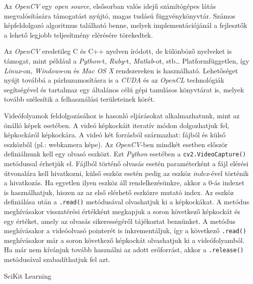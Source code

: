 






Az \textit{OpenCV} egy \textit{open source}, elsősorban valós idejű számítógépes látás megvalósítására támogatást nyújtó, magas tudású függvénykönyvtár. Számos képfeldolgozó algoritmus található benne, melyek implementációjánál a fejlesztők a lehető legjobb teljesítmény elérésére törekedtek.

Az \textit{OpenCV} eredetileg C és C++ nyelven íródott, de különböző nyelveket is támogat, mint például a \textit{Python}-t, \textit{Ruby}-t, \textit{Matlab}-ot, stb\ldots
Platformfüggetlen, így \textit{Linux}-on, \textit{Windows}-on és \textit{Mac OS X} rendszereken is használható. Lehetőséget nyújt továbbá a párhuzamosításra is a \textit{CUDA} és az \textit{OpenCL} technológiák segítségével és tartalmaz egy általános célú gépi tanulásos könyvtárat is, melyek tovább szélesítik a felhasználási területeinek körét. \cite{bradski2008learning}

Videófolyamok feldolgozásához is hasonló eljárásokat alkalmazhatunk, mint az önálló képek esetében. A videó képkockáit iteratív módon dolgozhatjuk fel, képkockáról képkockára. A videó két forrásból származhat: fájból és külső eszközből (pl.: webkamera képe). Az \textit{OpenCV}-ben mindkét esetben először definiálnunk kell egy olvasó eszközt. Ezt \textit{Python} esetében a \texttt{cv2.VideoCapture()} metódussal érhetjük el. Fájlból történő olvasás esetén paraméterként a fájl elérési útvonalára kell hivatkozni, külső eszköz esetén pedig az eszköz \textit{index}-ével történik a hivatkozás. Ha egyetlen ilyen eszköz áll rendelkezésünkre, akkor a 0-ás indexet is használhatjuk, hiszen az az első elérhető eszközre mutató index.
Az eszköz definiálása után a \texttt{.read()} metódusával olvashatjuk ki a képkockákat. A metódus meghívásakor visszatérési értékként megkapjuk a soron következő képkockát és egy értéket, amely az olvasás sikerességéről tájékoztat bennünket. A metódus meghívásakor a videóolvasó pointerét is inkrementáljuk, így a következő \texttt{.read()} meghívásakor már a soron következő képkockát olvashatjuk ki a videófolyamból. Ha már nem kívánjuk tovább használni az adott erőforrást, akkor a \texttt{.release()} metódusával szabadíthatjuk fel azt.


SciKit Learning
